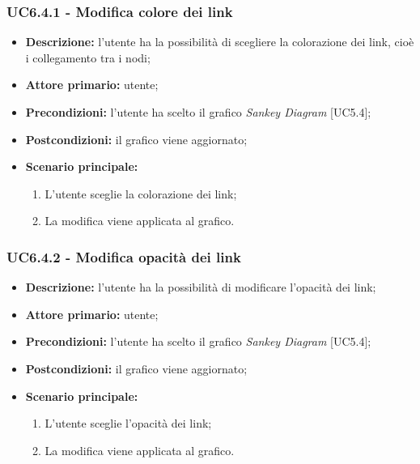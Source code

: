   \subsubsection{UC6.4.1 - Modifica colore dei link}
  \begin{itemize}
    \item \textbf{Descrizione:} l'utente ha la possibilità di scegliere la colorazione dei link, cioè i collegamento tra i nodi;
    \item \textbf{Attore primario:} utente;
    \item \textbf{Precondizioni:} l’utente ha scelto il grafico \textit{Sankey Diagram} [UC5.4];
    \item \textbf{Postcondizioni:} il grafico viene aggiornato;
    \item \textbf{Scenario principale:}
     \begin{enumerate}
      \item L'utente sceglie la colorazione dei link;
      \item La modifica viene applicata al grafico.
    \end{enumerate}
  \end{itemize}

  \subsubsection{UC6.4.2 - Modifica opacità dei link}
  \begin{itemize}
    \item \textbf{Descrizione:} l'utente ha la possibilità di modificare l'opacità dei link;
    \item \textbf{Attore primario:} utente;
    \item \textbf{Precondizioni:} l’utente ha scelto il grafico \textit{Sankey Diagram} [UC5.4];
    \item \textbf{Postcondizioni:} il grafico viene aggiornato;
    \item \textbf{Scenario principale:}
      \begin{enumerate}
      \item L'utente sceglie l'opacità dei link;
      \item La modifica viene applicata al grafico.
    \end{enumerate}
  \end{itemize}


